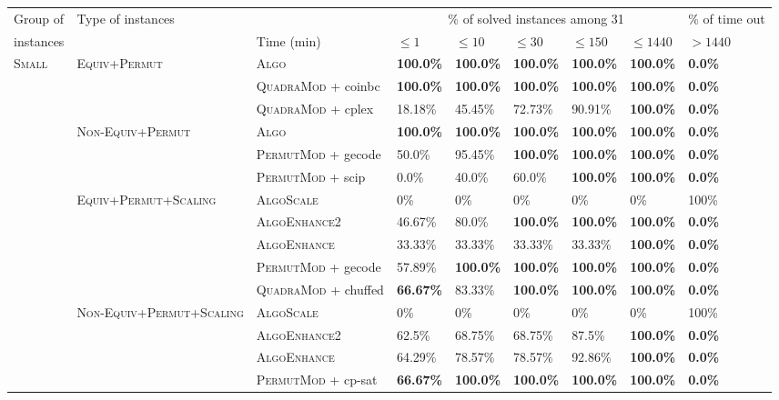 \documentclass{book}
\newcommand\id[1]{\textsc{#1}}
\begin{document}
\begin{table}[!ht]\scriptsize
\center

\begin{tabular}{|l|l|l|l|l|l|l|l|l|}\toprule Group of & \multirow{2}{*}{ Type of instances} & &\multicolumn{5}{c|}{\% of solved instances among 31} & \% of time out\\
\cmidrule(lr){3-9}
instances &  & Time (min)  & $\leq 1$ & $\leq 10$ & $\leq 30$ & $\leq 150$ & $\leq 1440$ & $> 1440$ \\
\midrule
 \multirow{15}{*}{\id{Small}} & \multirow{3}{*}{\id{Equiv+Permut}} & \textsc{Algo}   & \bf 100.0\% & \bf 100.0\% & \bf 100.0\% & \bf 100.0\% & \bf 100.0\% &  \bf 0.0\% \\
& & \textsc{QuadraMod} + coinbc   & \bf 100.0\% & \bf 100.0\% & \bf 100.0\% & \bf 100.0\% & \bf 100.0\% &  \bf 0.0\% \\
& & \textsc{QuadraMod} + cplex   & 18.18\% & 45.45\% & 72.73\% & 90.91\% & \bf 100.0\% &  \bf 0.0\% \\
\cmidrule(lr){2-9}
 & \multirow{3}{*}{\id{Non-Equiv+Permut}} & \textsc{Algo}   & \bf 100.0\% & \bf 100.0\% & \bf 100.0\% & \bf 100.0\% & \bf 100.0\% &  \bf 0.0\% \\
& & \textsc{PermutMod} + gecode   & 50.0\% & 95.45\% & \bf 100.0\% & \bf 100.0\% & \bf 100.0\% &  \bf 0.0\% \\
& & \textsc{PermutMod} + scip   & 0.0\% & 40.0\% & 60.0\% & \bf 100.0\% & \bf 100.0\% &  \bf 0.0\% \\
\cmidrule(lr){2-9}
 & \multirow{3}{*}{\id{Equiv+Permut+Scaling}} & \textsc{AlgoScale}   & 0\% & 0\% & 0\% & 0\% & 0\% & 100\% \\
& & \textsc{AlgoEnhance2}   & 46.67\% & 80.0\% & \bf 100.0\% & \bf 100.0\% & \bf 100.0\% &  \bf 0.0\% \\
& & \textsc{AlgoEnhance}   & 33.33\% & 33.33\% & 33.33\% & 33.33\% & \bf 100.0\% &  \bf 0.0\% \\
& & \textsc{PermutMod} + gecode   & 57.89\% & \bf 100.0\% & \bf 100.0\% & \bf 100.0\% & \bf 100.0\% &  \bf 0.0\% \\
& & \textsc{QuadraMod} + chuffed   & \bf 66.67\% & 83.33\% & \bf 100.0\% & \bf 100.0\% & \bf 100.0\% &  \bf 0.0\% \\
\cmidrule(lr){2-9}
 & \multirow{3}{*}{\id{Non-Equiv+Permut+Scaling}}& \textsc{AlgoScale}   & 0\% & 0\% & 0\% & 0\% & 0\% & 100\% \\
& & \textsc{AlgoEnhance2}   & 62.5\% & 68.75\% & 68.75\% & 87.5\% & \bf 100.0\% &  \bf 0.0\% \\
& & \textsc{AlgoEnhance}   & 64.29\% & 78.57\% & 78.57\% & 92.86\% & \bf 100.0\% &  \bf 0.0\% \\
& & \textsc{PermutMod} + cp-sat   & \bf 66.67\% & \bf 100.0\% & \bf 100.0\% & \bf 100.0\% & \bf 100.0\% &  \bf 0.0\% \\
\bottomrule\end{tabular}

\end{table}
\end{document}
